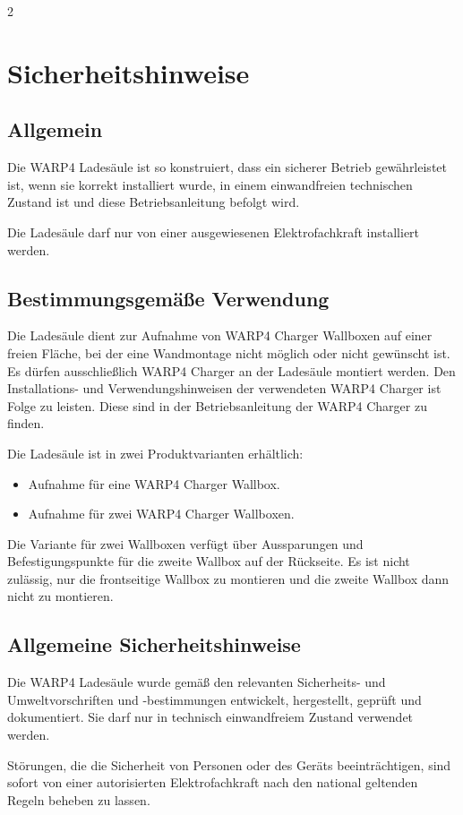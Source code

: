 \documentclass[a4paper,10pt]{article}
\newcommand{\hint}[1]{\begin{tcolorbox}[colback=boxgray,colframe=black,coltext=
white,title=Hinweis]#1\end{tcolorbox}}
\begin{document}
\begin{multicols}{2}
	\section{Sicherheitshinweise}
\vspace{-0.2cm}
	\subsection{Allgemein}
	Die WARP4 Ladesäule ist so konstruiert, dass ein sicherer Betrieb gewährleistet ist,
	wenn sie korrekt installiert wurde, in einem einwandfreien technischen Zustand
	ist und diese Betriebsanleitung befolgt wird. \hint{Die Ladesäule darf nur von einer ausgewiesenen Elektrofachkraft installiert
		werden.}
\vspace{-0.2cm}
	\subsection{Bestimmungsgemäße Verwendung}
	Die Ladesäule dient zur Aufnahme von WARP4 Charger Wallboxen auf einer freien
	Fläche, bei der eine Wandmontage nicht möglich oder nicht gewünscht ist.
	Es dürfen ausschließlich WARP4 Charger
	an der Ladesäule montiert werden. Den Installations- und
	Verwendungshinweisen der verwendeten WARP4 Charger ist Folge zu leisten.
	Diese sind in der Betriebsanleitung der WARP4 Charger zu finden.

	Die Ladesäule ist in zwei Produktvarianten erhältlich:
	\begin{itemize}
		\item Aufnahme für eine WARP4 Charger Wallbox.
		\item Aufnahme für zwei WARP4 Charger Wallboxen.
	\end{itemize}
	Die Variante für zwei Wallboxen verfügt über Aussparungen und
	Befestigungspunkte für die zweite Wallbox auf der Rückseite.
	Es ist nicht zulässig, nur die frontseitige Wallbox zu montieren und die
	zweite Wallbox dann nicht zu montieren.
\vspace{-0.2cm}
	\subsection{Allgemeine Sicherheitshinweise}

	Die WARP4 Ladesäule wurde gemäß den relevanten Sicherheits- und Umweltvorschriften und -bestimmungen
	entwickelt, hergestellt, geprüft und dokumentiert. Sie darf nur in technisch einwandfreiem Zustand verwendet werden.

	Störungen, die die Sicherheit von Personen oder des Geräts beeinträchtigen,
	sind sofort von einer autorisierten Elektrofachkraft nach den national geltenden Regeln beheben zu lassen.


\end{multicols}
\end{document}
